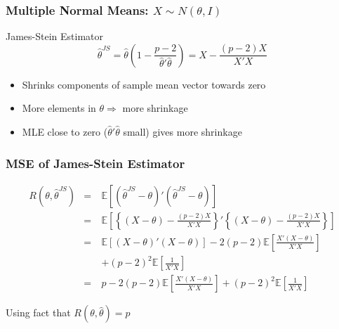 \begin{frame}
  \frametitle{Multiple Normal Means: $X \sim N(\theta, I)$}

  \begin{block}{James-Stein Estimator}
\begin{equation*}
  \hat{\theta}^{JS} = \hat{\theta}\left( 1 - \frac{p-2}{\hat{\theta}'\hat{\theta}} \right) = X - \frac{\left( p-2 \right)X}{X'X}
\end{equation*}
\begin{itemize}
  \item Shrinks components of sample mean vector towards zero
  \item More elements in $\theta \Rightarrow$ more shrinkage 
  \item MLE close to zero ($\widehat{\theta}'\widehat{\theta}$ small)    gives more shrinkage
\end{itemize}
  \end{block}
\end{frame}
\begin{frame}
  \frametitle{MSE of James-Stein Estimator}
  \small
\begin{eqnarray*}
  R\left(\theta, \hat{\theta}^{JS} \right) &=& \mathbb{E}\left[ \left( \hat{\theta}^{JS} - \theta \right)'\left( \hat{\theta}^{JS} - \theta \right) \right]\\
  &=& \mathbb{E}\left[ \left\{ \left( X - \theta \right) - \frac{(p-2)X}{X'X} \right\}' \left\{ \left( X - \theta \right) - \frac{(p-2)X}{X'X} \right\} \right]  \\
  &=&\mathbb{E}\left[ \left( X - \theta \right)'\left( X - \theta \right) \right] - 2 (p-2)\mathbb{E}\left[ \frac{X'(X-\theta)}{X'X} \right]\\
  &\quad& +\left( p-2 \right)^{2} \mathbb{E}\left[ \frac{1}{X'X} \right] \\
  &=& p - 2 (p-2)\mathbb{E}\left[ \frac{X'(X-\theta)}{X'X} \right] + \left( p-2 \right)^{2} \mathbb{E}\left[ \frac{1}{X'X} \right]
\end{eqnarray*}

Using fact that $R(\theta,\widehat{\theta})=p$ 
\end{frame}
